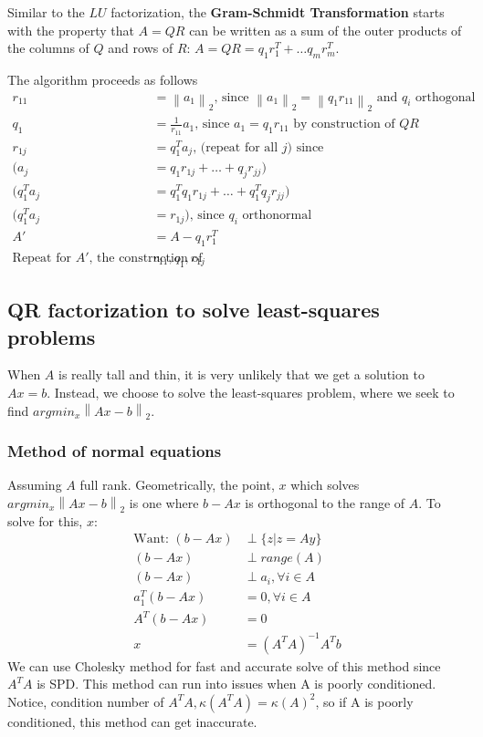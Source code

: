 \documentclass{article}
\newcommand{\norm}[2]{\left\lVert#1\right\rVert_#2}
\begin{document}
Similar to the $LU$ factorization, the \textbf{Gram-Schmidt Transformation} starts with the property that $A=QR$ can be written as a sum of the outer products of the columns of $Q$ and rows of $R$: $A = QR = q_1r_1^T + \dots q_mr_m^T$. 

The algorithm proceeds as follows
\begin{align*}
    r_{11} &= \norm{a_1}{2} \textrm{, since } \norm{a_1}{2} = \norm{q_1r_{11}}{2} \textrm{ and $q_i$ orthogonal}\\
    q_1 &= \frac{1}{r_{11}}a_1\textrm{, since } a_1 = q_1r_{11} \textrm{ by construction of } QR \\
    r_{1j} &= q_1^Ta_j \textrm{, (repeat for all $j$) since }\\
    (a_j &= q_1r_{1j} + \dots + q_jr_{jj})\\
    (q_1^Ta_j &= q_1^Tq_1r_{1j} + \dots + q_1^Tq_jr_{jj})\\
    (q_1^Ta_j &= r_{1j}) \textrm{, since $q_i$ orthonormal}\\
    A' &= A - q_1r_1^T\\
    \textrm{Repeat for $A'$, the construction of }& r_{11}, q_1, r_{1j}
\end{align*}


\subsection{QR factorization to solve least-squares problems}
When $A$ is really tall and thin, it is very unlikely that we get a solution to $Ax = b$. Instead, we choose to solve the least-squares problem, where we seek to find $argmin_x\norm{Ax - b}{2}$. 

\subsubsection{Method of normal equations}
Assuming $A$ full rank. Geometrically, the point, $x$ which solves $argmin_x\norm{Ax - b}{2}$ is one where $b-Ax$ is orthogonal to the range of $A$. To solve for this, $x$:
\begin{align*}
    \textrm{Want: } (b-Ax) &\perp \{z \vert z = Ay\}\\
    (b-Ax) &\perp range(A)\\
    (b-Ax) &\perp a_i, \forall i \in A\\
    a_1^T(b-Ax) &= 0, \forall i \in A\\
    A^T(b-Ax) &= 0\\
    x &= (A^TA)^{-1}A^Tb
\end{align*}
We can use Cholesky method for fast and accurate solve of this method since $A^TA$ is SPD. This method can run into issues when A is poorly conditioned. Notice, condition number of $A^TA, \kappa(A^TA) = \kappa(A)^2$, so if A is poorly conditioned, this method can get inaccurate. 
\end{document}
